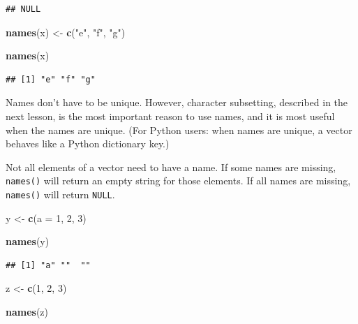 \documentclass[
]{book}
\newenvironment{Shaded}{\begin{snugshade}}{\end{snugshade}}
\newcommand{\AttributeTok}[1]{\textcolor[rgb]{0.13,0.29,0.53}{#1}}
\newcommand{\DecValTok}[1]{\textcolor[rgb]{0.00,0.00,0.81}{#1}}
\newcommand{\FunctionTok}[1]{\textcolor[rgb]{0.13,0.29,0.53}{\textbf{#1}}}
\newcommand{\NormalTok}[1]{#1}
\newcommand{\OtherTok}[1]{\textcolor[rgb]{0.56,0.35,0.01}{#1}}
\newcommand{\StringTok}[1]{\textcolor[rgb]{0.31,0.60,0.02}{#1}}
\begin{document}
\begin{verbatim}
## NULL
\end{verbatim}

\begin{Shaded}
\begin{Highlighting}[]
\FunctionTok{names}\NormalTok{(x) }\OtherTok{\textless{}{-}} \FunctionTok{c}\NormalTok{(}\StringTok{"e"}\NormalTok{, }\StringTok{"f"}\NormalTok{, }\StringTok{"g"}\NormalTok{)}

\FunctionTok{names}\NormalTok{(x)}
\end{Highlighting}
\end{Shaded}

\begin{verbatim}
## [1] "e" "f" "g"
\end{verbatim}

Names don't have to be unique. However, character subsetting, described in the next lesson, is the most important reason to use names, and it is most useful when the names are unique. (For Python users: when names are unique, a vector behaves like a Python dictionary key.)

Not all elements of a vector need to have a name. If some names are missing, \texttt{names()} will return an empty string for those elements. If all names are missing, \texttt{names()} will return \texttt{NULL}.

\begin{Shaded}
\begin{Highlighting}[]
\NormalTok{y }\OtherTok{\textless{}{-}} \FunctionTok{c}\NormalTok{(}\AttributeTok{a =} \DecValTok{1}\NormalTok{, }\DecValTok{2}\NormalTok{, }\DecValTok{3}\NormalTok{)}

\FunctionTok{names}\NormalTok{(y)}
\end{Highlighting}
\end{Shaded}

\begin{verbatim}
## [1] "a" ""  ""
\end{verbatim}

\begin{Shaded}
\begin{Highlighting}[]
\NormalTok{z }\OtherTok{\textless{}{-}} \FunctionTok{c}\NormalTok{(}\DecValTok{1}\NormalTok{, }\DecValTok{2}\NormalTok{, }\DecValTok{3}\NormalTok{)}

\FunctionTok{names}\NormalTok{(z)}
\end{Highlighting}
\end{Shaded}
\end{document}
